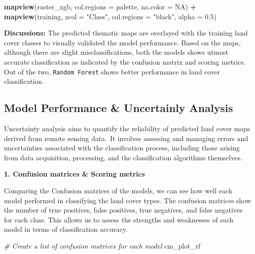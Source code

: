 \documentclass[
]{article}
\newenvironment{Shaded}{\begin{snugshade}}{\end{snugshade}}
\newcommand{\AttributeTok}[1]{\textcolor[rgb]{0.13,0.29,0.53}{#1}}
\newcommand{\CommentTok}[1]{\textcolor[rgb]{0.56,0.35,0.01}{\textit{#1}}}
\newcommand{\ConstantTok}[1]{\textcolor[rgb]{0.56,0.35,0.01}{#1}}
\newcommand{\FloatTok}[1]{\textcolor[rgb]{0.00,0.00,0.81}{#1}}
\newcommand{\FunctionTok}[1]{\textcolor[rgb]{0.13,0.29,0.53}{\textbf{#1}}}
\newcommand{\NormalTok}[1]{#1}
\newcommand{\SpecialCharTok}[1]{\textcolor[rgb]{0.81,0.36,0.00}{\textbf{#1}}}
\newcommand{\StringTok}[1]{\textcolor[rgb]{0.31,0.60,0.02}{#1}}
\begin{document}
\begin{Shaded}
\begin{Highlighting}[]
\FunctionTok{mapview}\NormalTok{(raster\_xgb, }\AttributeTok{col.regions =}\NormalTok{ palette, }\AttributeTok{na.color =} \ConstantTok{NA}\NormalTok{) }\SpecialCharTok{+} 
  \FunctionTok{mapview}\NormalTok{(training, }\AttributeTok{zcol =} \StringTok{"Class"}\NormalTok{, }\AttributeTok{col.regions =} \StringTok{"black"}\NormalTok{, }\AttributeTok{alpha =} \FloatTok{0.5}\NormalTok{)}
\end{Highlighting}
\end{Shaded}

\textbf{Discussions:} The predicted thematic maps are overlayed with the
training land cover classes to visually validated the model performance.
Based on the maps, although there are slight misclassifications, both
the models shows utmost accurate classification as indicated by the
confusion matrix and scoring metrics. Out of the two,
\texttt{Random\ Forest} shows better performance in land cover
classification.

\subsection{Model Performance \& Uncertainly
Analysis}\label{model-performance-uncertainly-analysis}

Uncertainty analysis aims to quantify the reliability of predicted land
cover maps derived from remote sensing data.~It involves assessing and
managing errors and uncertainties associated with the classification
process, including those arising from data acquisition, processing, and
the classification algorithms themselves.~

\textbf{1. Confusion matrices \& Scoring metrics}

Comparing the Confusion matrices of the models, we can see how well each
model performed in classifying the land cover types. The confusion
matrices show the number of true positives, false positives, true
negatives, and false negatives for each class. This allows us to assess
the strengths and weaknesses of each model in terms of classification
accuracy.

\begin{Shaded}
\begin{Highlighting}[]
\CommentTok{\# Create a list of confusion matrices for each model}
\NormalTok{cm\_plot\_rf}
\end{Highlighting}
\end{Shaded}
\end{document}
